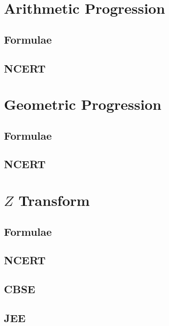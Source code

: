 \documentclass[journal]{IEEEtran}
\begin{document}
\newpage


\tableofcontents

\newpage
\onecolumn


\renewcommand{\thetable}{\theenumi}

\section{Arithmetic Progression}
\subsection{Formulae}

\subsection{NCERT}

\section{Geometric Progression}
\subsection{Formulae}
%
\subsection{NCERT}

\section{$Z$ Transform}
\subsection{Formulae}
%
\subsection{NCERT}

\iffalse
\subsection{CBSE}

\subsection{JEE}

%
\end{document}

